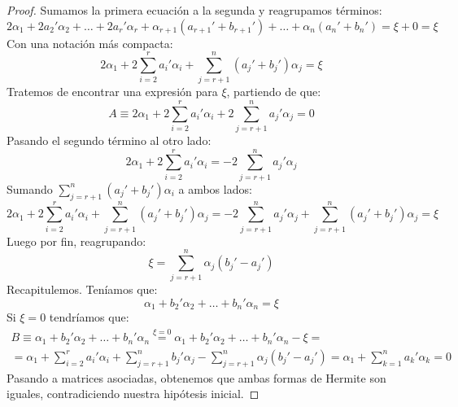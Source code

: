 \begin{proof}
	Sumamos la primera ecuación a la segunda y reagrupamos términos:
	\[2\alpha_1+2a_2'\alpha_2+\dots+2a_r'\alpha_r+\alpha_{r+1}(a_{r+1}'+b_{r+1}')+\dots+\alpha_n(a_n'+b_n')=\xi+0=\xi\]
	Con una notación más compacta:
	\[2\alpha_1+2\sum_{i=2}^{r}a_i'\alpha_i+\sum_{j=r+1}^{n}(a_j'+b_j')\alpha_j=\xi\]
	Tratemos de encontrar una expresión para $\xi$, partiendo de que:
	\[ A\equiv2\alpha_1+2\sum_{i=2}^{r}a_i'\alpha_i+2\sum_{j=r+1}^{n}a_j'\alpha_j=0\]
	Pasando el segundo término al otro lado:
	\[2\alpha_1+2\sum_{i=2}^{r}a_i'\alpha_i=-2\sum_{j=r+1}^{n}a_j'\alpha_j\]
	Sumando $\sum_{j=r+1}^{n}(a_j'+b_j')\alpha_i$ a ambos lados:
	\[2\alpha_1+2\sum_{i=2}^{r}a_i'\alpha_i+\sum_{j=r+1}^{n}(a_j'+b_j')\alpha_j=-2\sum_{j=r+1}^{n}a_j'\alpha_j+\sum_{j=r+1}^{n}(a_j'+b_j')\alpha_j=\xi\]
	Luego por fin, reagrupando:
	\[\xi=\sum_{j=r+1}^{n}\alpha_{j}(b_{j}'-a_{j}')\]
	Recapitulemos. Teníamos que:
	\[\alpha_1+b_2'\alpha_2+\dots+b_n'\alpha_n=\xi\]
	Si $\xi=0$ tendríamos que:
	\begin{multline*}B\equiv\alpha_1+b_2'\alpha_2+\dots+b_n'\alpha_n\stackrel{\xi=0}{=}\alpha_1+b_2'\alpha_2+\dots+b_n'\alpha_n-\xi=\\ =\alpha_1+\sum_{i=2}^{r}a_i'\alpha_i+\sum_{j=r+1}^{n}b_j'\alpha_j-\sum_{j=r+1}^{n}\alpha_{j}(b_{j}'-a_{j}')=\alpha_1+\sum_{k=1}^{n}a_k'\alpha_k=0\end{multline*}
	Pasando a matrices asociadas, obtenemos que ambas formas de Hermite son iguales, contradiciendo nuestra hipótesis inicial.
\end{proof}